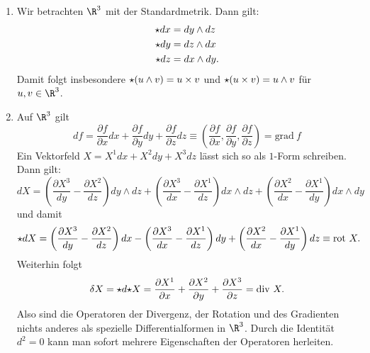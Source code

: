 \begin{beispiele}
\begin{enumerate}
\item Wir betrachten $\R^3$ mit der Standardmetrik. Dann gilt:
\begin{align}
{\star} dx &= dy \wedge dz\\
{\star} dy &= dz \wedge dx\\
{\star} dz &= dx \wedge dy.
\end{align}
Damit folgt insbesondere ${\star} (u \wedge v) = u \times v$ und ${\star} (u \times v) = u \wedge v$ für $u,v \in \R^3$.
\item Auf $\R^3$ gilt 
\begin{equation}
df = \frac{\partial f}{\partial x} dx + \frac{\partial f}{\partial y} dy + \frac{\partial f}{\partial z} dz \equiv \left(\frac{\partial f}{\partial x},  \frac{\partial f}{\partial y},\frac{\partial f}{\partial z} \right) = \text{grad} \ f
\end{equation}
Ein Vektorfeld $X = X^1 dx + X^2 dy + X^3 dz$ lässt sich so als $1$-Form schreiben. Dann gilt:
\begin{equation}
dX = \left(\frac{\partial X^3}{dy} - \frac{\partial X^2}{dz} \right) dy \wedge dz + \left(\frac{\partial X^3}{dx} - \frac{\partial X^1}{dz} \right) dx \wedge dz + \left(\frac{\partial X^2}{dx} - \frac{\partial X^1}{dy} \right) dx \wedge dy
\end{equation}
und damit
\begin{equation}
\hodge dX =  \left(\frac{\partial X^3}{dy} - \frac{\partial X^2}{dz} \right) dx - \left(\frac{\partial X^3}{dx} - \frac{\partial X^1}{dz} \right) dy + \left(\frac{\partial X^2}{dx} - \frac{\partial X^1}{dy} \right) dz \equiv \text{rot} \ X.
\end{equation}
Weiterhin folgt
\begin{equation}
\delta X = \hodge d \hodge X = \frac{\partial X^1}{\partial x} + \frac{\partial X^2}{\partial y} + \frac{\partial X^3}{\partial z} = \text{div} \ X.
\end{equation}
Also sind die Operatoren der Divergenz, der Rotation und des Gradienten nichts anderes als spezielle Differentialformen in $\R^3$. Durch die Identität $d^2=0$ kann man sofort mehrere Eigenschaften der Operatoren herleiten.
\end{enumerate}
\end{beispiele}
